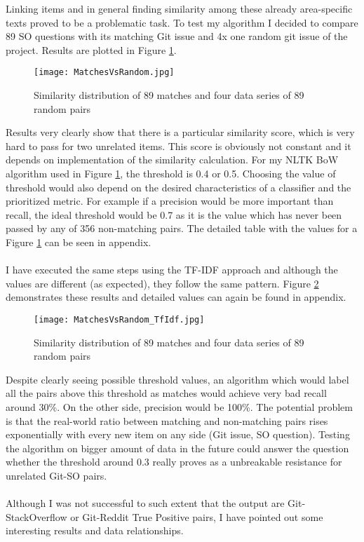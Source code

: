 Linking items and in general finding similarity among these already area-specific texts proved to be a problematic task. To test my algorithm I decided to compare 89 SO questions with its matching Git issue and 4x one random git issue of the project. Results are plotted in Figure \ref{fig:MatchesVsRandom}.\\

\begin{figure}[H]%
    \centering
	\texttt{[image: MatchesVsRandom.jpg]}
    \caption{Similarity distribution of 89 matches and four data series of 89 random pairs}%
    \label{fig:MatchesVsRandom}%
\end{figure}
Results very clearly show that there is a particular similarity score, which is very hard to pass for two unrelated items. This score is obviously not constant and it depends on implementation of the similarity calculation. For my NLTK BoW algorithm used in Figure \ref{fig:MatchesVsRandom}, the threshold is 0.4 or 0.5. Choosing the value of threshold would also depend on the  desired characteristics of a classifier and the prioritized metric. For example if a precision would be more important than recall, the ideal threshold would be 0.7 as it is the value which has never been passed by any of 356 non-matching pairs. The detailed table with the values for a Figure \ref{fig:MatchesVsRandom} can be seen in appendix.\\
\\
I have executed the same steps using the TF-IDF approach and although the values are different (as expected), they follow the same pattern. Figure \ref{fig:MatchesVsRandom_TfIdf} demonstrates these results and detailed values can again be found in appendix.

\begin{figure}[H]%
    \centering
	\texttt{[image: MatchesVsRandom\_TfIdf.jpg]}
    \caption{Similarity distribution of 89 matches and four data series of 89 random pairs}%
    \label{fig:MatchesVsRandom_TfIdf}%
\end{figure}

Despite clearly seeing possible threshold values, an algorithm which would label all the pairs above this threshold as matches would achieve very bad recall around 30\%. On the other side, precision would be 100\%. The potential problem is that the real-world ratio between matching and non-matching pairs rises exponentially with every new item on any side (Git issue, SO question). Testing the algorithm on bigger amount of data in the future could answer the question whether the threshold around 0.3 really proves as a unbreakable resistance for unrelated Git-SO pairs.\\
\\
Although I was not successful to such extent that the output are Git-StackOverflow or Git-Reddit True Positive pairs, I have pointed out some interesting results and data relationships.

